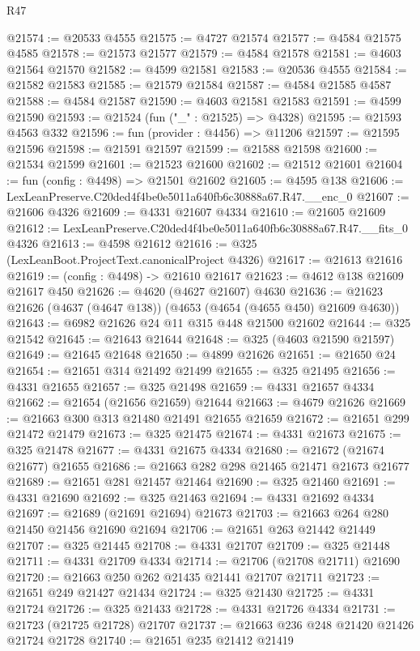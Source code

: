\begin{lexlean}{R47}
\begin{coremodule}
@21574 := @20533 @4555
@21575 := @4727 @21574
@21577 := @4584 @21575 @4585
@21578 := @21573 @21577
@21579 := @4584 @21578
@21581 := @4603 @21564 @21570
@21582 := @4599 @21581
@21583 := @20536 @4555
@21584 := @21582 @21583
@21585 := @21579 @21584
@21587 := @4584 @21585 @4587
@21588 := @4584 @21587
@21590 := @4603 @21581 @21583
@21591 := @4599 @21590
@21593 := @21524 (fun ("_" : @21525) => @4328)
@21595 := @21593 @4563 @332
@21596 := fun (provider : @4456) => @11206
@21597 := @21595 @21596
@21598 := @21591 @21597
@21599 := @21588 @21598
@21600 := @21534 @21599
@21601 := @21523 @21600
@21602 := @21512 @21601
@21604 := fun (config : @4498) => @21501 @21602
@21605 := @4595 @138
@21606 := LexLeanPreserve.C20ded4f4be0e5011a640fb6c30888a67.R47.__enc_0
@21607 := @21606 @4326
@21609 := @4331 @21607 @4334
@21610 := @21605 @21609
@21612 := LexLeanPreserve.C20ded4f4be0e5011a640fb6c30888a67.R47.__fits_0 @4326
@21613 := @4598 @21612
@21616 := @325 (LexLeanBoot.ProjectText.canonicalProject @4326)
@21617 := @21613 @21616
@21619 := (config : @4498) -> @21610 @21617
@21623 := @4612 @138 @21609 @21617 @450
@21626 := @4620 (@4627 @21607) @4630
@21636 := @21623 @21626 (@4637 (@4647 @138)) (@4653 (@4654 (@4655 @450) @21609 @4630))
@21643 := @6982 @21626 @24 @11 @315 @448 @21500 @21602
@21644 := @325 @21542
@21645 := @21643 @21644
@21648 := @325 (@4603 @21590 @21597)
@21649 := @21645 @21648
@21650 := @4899 @21626
@21651 := @21650 @24
@21654 := @21651 @314 @21492 @21499
@21655 := @325 @21495
@21656 := @4331 @21655
@21657 := @325 @21498
@21659 := @4331 @21657 @4334
@21662 := @21654 (@21656 @21659) @21644
@21663 := @4679 @21626
@21669 := @21663 @300 @313 @21480 @21491 @21655 @21659
@21672 := @21651 @299 @21472 @21479
@21673 := @325 @21475
@21674 := @4331 @21673
@21675 := @325 @21478
@21677 := @4331 @21675 @4334
@21680 := @21672 (@21674 @21677) @21655
@21686 := @21663 @282 @298 @21465 @21471 @21673 @21677
@21689 := @21651 @281 @21457 @21464
@21690 := @325 @21460
@21691 := @4331 @21690
@21692 := @325 @21463
@21694 := @4331 @21692 @4334
@21697 := @21689 (@21691 @21694) @21673
@21703 := @21663 @264 @280 @21450 @21456 @21690 @21694
@21706 := @21651 @263 @21442 @21449
@21707 := @325 @21445
@21708 := @4331 @21707
@21709 := @325 @21448
@21711 := @4331 @21709 @4334
@21714 := @21706 (@21708 @21711) @21690
@21720 := @21663 @250 @262 @21435 @21441 @21707 @21711
@21723 := @21651 @249 @21427 @21434
@21724 := @325 @21430
@21725 := @4331 @21724
@21726 := @325 @21433
@21728 := @4331 @21726 @4334
@21731 := @21723 (@21725 @21728) @21707
@21737 := @21663 @236 @248 @21420 @21426 @21724 @21728
@21740 := @21651 @235 @21412 @21419

\end{coremodule}
\end{lexlean}
